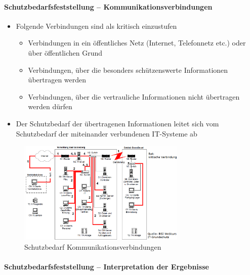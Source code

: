 \documentclass[10pt,a4paper]{article}
\begin{document}
\paragraph*{Schutzbedarfsfeststellung – Kommunikationsverbindungen}
\begin{itemize}[noitemsep,topsep=0pt,leftmargin=*]
    \item Folgende Verbindungen sind als kritisch einzustufen
    \begin{itemize}[noitemsep,topsep=0pt,leftmargin=*]
        \item Verbindungen in ein öffentliches Netz (Internet,
        Telefonnetz etc.) oder über öffentlichen Grund
        \item Verbindungen, über die besonders schützenswerte
        Informationen übertragen werden
        \item Verbindungen, über die vertrauliche Informationen nicht
        übertragen werden dürfen
    \end{itemize}
    \item Der Schutzbedarf der übertragenen Informationen
    leitet sich vom Schutzbedarf der miteinander
    verbundenen IT-Systeme ab
\end{itemize}

\begin{figure}[H]
    \begin{center}
    \includegraphics[width=8cm]{images/Schutzbedarf Kommunikationsverbindungen.png}
    \caption{Schutzbedarf Kommunikationsverbindungen}
    \label{Schutzbedarf Kommunikationsverbindungen}
    \end{center}
\end{figure}

\paragraph*{Schutzbedarfsfeststellung – Interpretation der Ergebnisse}
\end{document}
